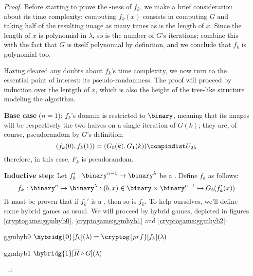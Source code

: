 \begin{proof}

    Before starting to prove the \prf-ness of $f_k$, we make a brief consideration about its time complexity: computing $f_k(x)$ consists in computing $G$ and taking half of the resulting image as many times as is the length of $x$. Since the length of $x$ is polynomial in $\lambda$, so is the number of $G$'s iterations; combine this with the fact that $G$ is itself polynomial by definition, and we conclude that $f_k$ is polynomial too.

    Having cleared any doubts about $f_k$'s time complexity, we now turn to the essential point of interest: its pseudo-randomness. The proof will proceed by induction over the lentgth of $x$, which is also the height of the tree-like structure modeling the algorithm.
    
    \textbf{Base case} ($n = 1$): $f_k$'s domain is restricted to $\binary$, meaning that its images will be respectively the two halves on a single iteration of $G(k)$; they are, of course, pseudorandom by $G$'s definition:
    \[
        (f_k(0), f_k(1)) = (G_0(k), G_1(k)) \compindist U_{2\lambda}
    \]
    therefore, in this case, $F_k$ is pseudorandom.

    \textbf{Inductive step}: Let $f'_k : \binary^{n - 1} \to \binary^\lambda$ be a \prf. Define $f_k$ as follows:
    \[
        f_k : \binary^n \to \binary^\lambda : (b, x) \in \binary \times \binary^{n - 1} \mapsto G_b(f'_k(x))
    \]
    It must be proven that if $f_k'$ is a \prf, then so is $f_k$. To help ourselves, we'll define some hybrid games as usual. We will proceed by hybrid games, depicted in figures \ref{cryptogame:ggmhyb0}, \ref{cryptogame:ggmhyb1} and \ref{cryptogame:ggmhyb2}:

    \begin{cryptogame}
        {ggmhyb0}
        {$\hybridg{0}[f_k](\lambda) = \cryptog{prf}[f_k](\lambda)$}
        {}


    \end{cryptogame}

    \begin{cryptogame}
        {ggmhyb1}
        {$\hybridg{1}[\overline{R} \circ G](\lambda)$}
        {}


\end{cryptogame}
\end{proof}
